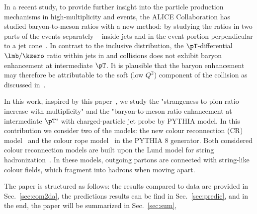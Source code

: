 \documentclass[ALICE,manyauthors]{StrinJet}
\begin{document}
In a recent study, to provide further insight into the particle production mechanisms in high-multiplicity \pp and \pPb events,
the ALICE Collaboration has studied baryon-to-meson ratios with a new method: by studying the ratios in two parts of the events separately -- inside jets and in the event portion perpendicular to a jet cone~\cite{ALICE:2021cvd}. 
In contrast to the inclusive distribution, the $\pT$-differential $\lmb/\kzero$ ratio within jets in \pp and \pPb collisions does not exhibit baryon enhancement at intermediate $\pT$.
It is plausible that the baryon enhancement may therefore be attributable to the soft (low $Q^{2}$) component of the collision as discussed in~\cite{Cuautle:2014yda}.

In this work, inspired by this paper~\cite{ALICE:2021cvd}, we study the "strangeness to pion ratio increase with multiplicity" and the "baryon-to-meson ratio enhancement at intermediate $\pT$" with charged-particle jet probe by PYTHIA model. 
In this contribution we consider two of the models: the new colour reconnection (CR) model~\cite{Christiansen:2015yqa, Sjostrand:2014zea} and the colour rope model~\cite{Biro:1984cf, Bierlich:2014xba, Flensburg:2011kk} in the PYTHIA 8 generator.
Both considered colour reconnection models are built upon the Lund model for string hadronization~\cite{Andersson:1983ia, Buckley:2011ms}.  In these models, outgoing partons are connected with string-like colour fields, which fragment into hadrons when moving apart.

The paper is structured as follows:%
the results compared to data are provided in Sec.~\ref{sec:com2da}, the predictions results can be find in Sec.~\ref{sec:predic}, and in the end, the paper will be summarized in Sec.~\ref{sec:sum},


\end{document}
